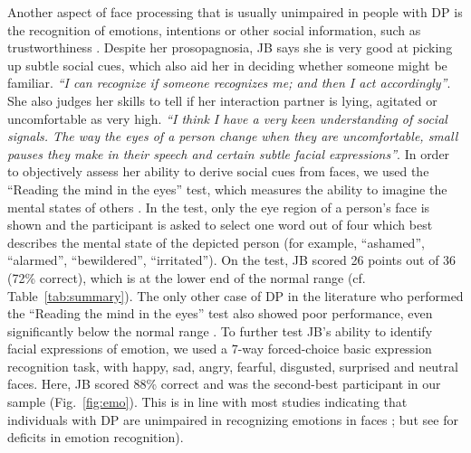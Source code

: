 \documentclass[fleqn,10pt]{SelfArx} %
\begin{document}
Another aspect of face processing that is usually unimpaired in people with DP is the recognition of emotions, intentions or other social information, such as trustworthiness \citep{Todorov_2008, Duchaine_2009}. Despite her prosopagnosia, JB says she is very good at picking up subtle social cues, which also aid her in deciding whether someone might be familiar. \textit{“I can recognize if someone recognizes me; and then I act accordingly”}. She also judges her skills to tell if her interaction partner is lying, agitated or uncomfortable as very high. \textit{“I think I have a very keen understanding of social signals. The way the eyes of a person change when they are uncomfortable, small pauses they make in their speech and certain subtle facial expressions”}. In order to objectively assess her ability to derive social cues from faces, we used the “Reading the mind in the eyes” test, which measures the ability to imagine the mental states of others \citep{Baron_Cohen_2001}. In the test, only the eye region of a person's face is shown and the participant is asked to select one word out of four which best describes the mental state of the depicted person (for example, “ashamed”, “alarmed”, “bewildered”, “irritated”). On the test, JB scored 26 points out of 36 (72\% correct), which is at the lower end of the normal range (cf. Table~\ref{tab:summary}). The only other case of DP in the literature who performed the “Reading the mind in the eyes” test also showed poor performance, even significantly below the normal range \citep{Duchaine_2006cog}.
To further test JB's ability to identify facial expressions of emotion, we used a 7-way forced-choice basic expression recognition task, with happy, sad, angry, fearful, disgusted, surprised and neutral faces. Here, JB scored 88\% correct and was the second-best participant in our sample (Fig.~\ref{fig:emo}). This is in line with most studies indicating that individuals with DP are unimpaired in recognizing emotions in faces \citep{Duchaine_2003, Humphreys_2006}; but see \citep{Duchaine_2006cog} for deficits in emotion recognition).
\end{document}
